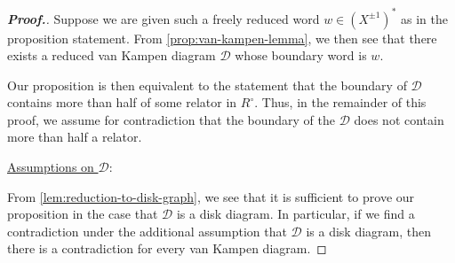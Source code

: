 \documentclass[11pt,a4paper,reqno]{amsart}
\theoremstyle{plain}
\theoremstyle{definition}
\theoremstyle{definition}
\newenvironment{myproof}{\begin{proof}[\normalfont\bfseries Proof.]}{\end{proof}}
\begin{document}
\begin{myproof}

Suppose we are given such a freely reduced word $w\in (X^{\pm 1})^*$ as in the proposition statement.
From \cref{prop:van-kampen-lemma}, we then see that there exists a reduced van Kampen diagram $\mathcal D$ whose boundary word is $w$.

Our proposition is then equivalent to the statement that the boundary of $\mathcal D$ contains more than half of some relator in $R^\circ$.
Thus, in the remainder of this proof, we assume for contradiction that the boundary of the $\mathcal D$ does not contain more than half a relator.

\medskip
\noindent
\underline{Assumptions on $\mathcal D$}:\nopagebreak

\smallskip\nopagebreak
\noindent\nopagebreak
From \cref{lem:reduction-to-disk-graph}, we see that it is sufficient to prove our proposition in the case that $\mathcal D$ is a disk diagram.
In particular, if we find a contradiction under the additional assumption that $\mathcal D$ is a disk diagram, then there is a contradiction for every van Kampen diagram.


\end{myproof}
\end{document}
